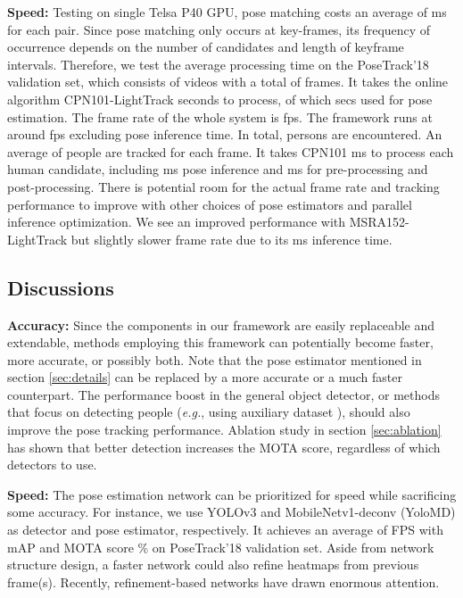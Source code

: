\documentclass[10pt,twocolumn,letterpaper]{article}
\begin{document}
	
	\noindent\textbf{Speed:} 
	Testing on single Telsa P40 GPU, pose matching costs an average of  ms for each pair.
	Since pose matching only occurs at key-frames, its frequency of occurrence depends on the number of candidates and length of keyframe intervals. 
	Therefore, we test the average processing time on the PoseTrack'18 validation set, which consists of  videos with a total of  frames. It takes the online algorithm CPN101-LightTrack  seconds to process, of which  secs used for pose estimation. The frame rate of the whole system is  fps.  
	The framework runs at around  fps excluding pose inference time.
	In total,  persons are encountered. An average of  people are tracked for each frame.
	It takes CPN101  ms to process each human candidate, including  ms pose inference and  ms for pre-processing and post-processing.  
	There is potential room for the actual frame rate and tracking performance to improve with other choices of pose estimators and parallel inference optimization.
	We see an improved performance with MSRA152-LightTrack but slightly slower frame rate due to its  ms inference time. 
	
	\subsection{Discussions}
\noindent\textbf{Accuracy:} 
	Since the components in our framework are easily replaceable and extendable, methods employing this framework can potentially become faster, more accurate, or possibly both.
	Note that the pose estimator mentioned in section \ref{sec:details} can be replaced by a more accurate \cite{li2019rethinking} or a much faster counterpart. 
	The performance boost in the general object detector, or methods that focus on detecting people (\emph{e.g.}, using auxiliary dataset \cite{li2018crowdpose}), should also improve the pose tracking performance.
	Ablation study in section \ref{sec:ablation} has shown that better detection increases the MOTA score, regardless of which detectors to use.
	
	
	\noindent\textbf{Speed:} 
	The pose estimation network can be prioritized for speed while sacrificing some accuracy. 
	For instance, we use YOLOv3 and MobileNetv1-deconv (YoloMD) as detector and pose estimator, respectively. It achieves an average of  FPS with  mAP and MOTA score \% on PoseTrack'18 validation set.  
	Aside from network structure design, a faster network could also refine heatmaps from previous frame(s). 
	Recently, refinement-based networks \cite{moon2018posefix, Fieraru2018LearningTR} have drawn enormous attention. 
\end{document}

